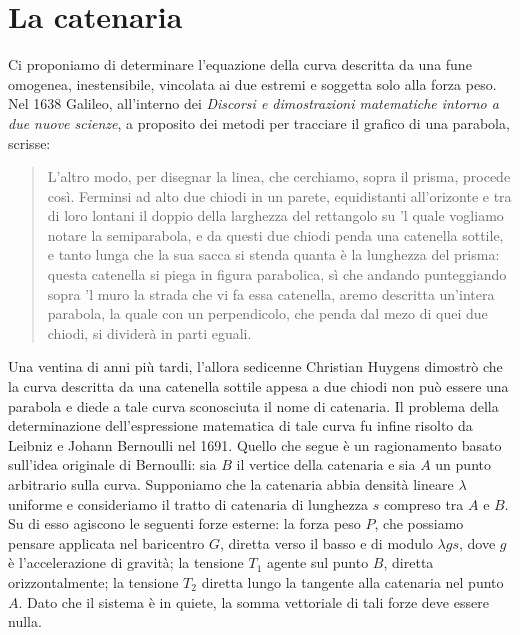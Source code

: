 \documentclass[11pt,a4paper]{article}
\begin{document}
\section{La catenaria}

Ci proponiamo di determinare l'equazione della curva descritta da una fune omogenea, inestensibile, vincolata ai due estremi e soggetta solo alla forza peso. Nel 1638 Galileo, all'interno dei \emph{Discorsi e dimostrazioni matematiche intorno a due nuove scienze}, a proposito dei metodi per tracciare il grafico di una parabola, scrisse:

\begin{quote}
L'altro modo, per disegnar la linea, che cerchiamo, sopra il prisma, procede così. Ferminsi ad alto due chiodi in un parete, equidistanti all'orizonte e tra di loro lontani il doppio della larghezza del rettangolo su 'l quale vogliamo notare la semiparabola, e da questi due chiodi penda una catenella sottile, e tanto lunga che la sua sacca si stenda quanta è la lunghezza del prisma: questa catenella si piega in figura parabolica, sì che andando punteggiando sopra 'l muro la strada che vi fa essa catenella, aremo descritta un'intera parabola, la quale con un perpendicolo, che penda dal mezo di quei due chiodi, si dividerà in parti eguali.
\end{quote}

Una ventina di anni più tardi, l'allora sedicenne Christian Huygens dimostrò che la curva descritta da una catenella sottile appesa a due chiodi non può essere una parabola e diede a tale curva sconosciuta il nome di catenaria. Il problema della determinazione dell'espressione matematica di tale curva fu infine risolto da Leibniz e Johann Bernoulli nel 1691. Quello che segue è un ragionamento basato sull'idea originale di Bernoulli: sia $B$ il vertice della catenaria e sia $A$ un punto arbitrario sulla curva. Supponiamo che la catenaria abbia densità lineare $\lambda$ uniforme e consideriamo il tratto di catenaria di lunghezza $s$ compreso tra $A$ e $B$. Su di esso agiscono le seguenti forze esterne: la forza peso $P$, che possiamo pensare applicata nel baricentro $G$, diretta verso il basso e di modulo $\lambda gs$, dove $g$ è l'accelerazione di gravità; la tensione $T_1$ agente sul punto $B$, diretta orizzontalmente; la tensione $T_2$ diretta lungo la tangente alla catenaria nel punto $A$. Dato che il sistema è in quiete, la somma vettoriale di tali forze deve essere nulla.
\end{document}
